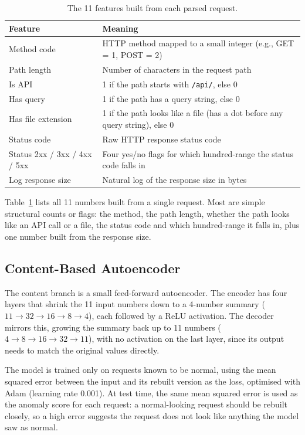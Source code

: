 \documentclass[futureinternet,article,submit,moreauthors]{Definitions/mdpi}
\begin{document}
\begin{table}[H]
\caption{The 11 features built from each parsed request.}
\label{tab:features}
\begin{tabularx}{\textwidth}{lX}
\toprule
\textbf{Feature} & \textbf{Meaning} \\
\midrule
Method code & HTTP method mapped to a small integer (e.g., GET = 1, POST = 2) \\
Path length & Number of characters in the request path \\
Is API & 1 if the path starts with \texttt{/api/}, else 0 \\
Has query & 1 if the path has a query string, else 0 \\
Has file extension & 1 if the path looks like a file (has a dot before any query string), else 0 \\
Status code & Raw HTTP response status code \\
Status 2xx / 3xx / 4xx / 5xx & Four yes/no flags for which hundred-range the status code falls in \\
Log response size & Natural log of the response size in bytes \\
\bottomrule
\end{tabularx}
\end{table}

Table~\ref{tab:features} lists all 11 numbers built from a single request. Most are simple structural counts or flags: the method, the path length, whether the path looks like an API call or a file, the status code and which hundred-range it falls in, plus one number built from the response size.

\subsection{Content-Based Autoencoder} \label{sec4.4}

The content branch is a small feed-forward autoencoder. The encoder has four layers that shrink the 11 input numbers down to a 4-number summary ($11 \rightarrow 32 \rightarrow 16 \rightarrow 8 \rightarrow 4$), each followed by a ReLU activation. The decoder mirrors this, growing the summary back up to 11 numbers ($4 \rightarrow 8 \rightarrow 16 \rightarrow 32 \rightarrow 11$), with no activation on the last layer, since its output needs to match the original values directly.

The model is trained only on requests known to be normal, using the mean squared error between the input and its rebuilt version as the loss, optimised with Adam (learning rate 0.001). At test time, the same mean squared error is used as the anomaly score for each request: a normal-looking request should be rebuilt closely, so a high error suggests the request does not look like anything the model saw as normal.
\end{document}
